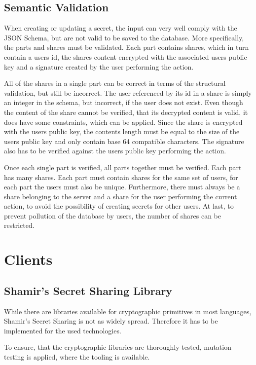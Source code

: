 \subsection{Semantic Validation}

When creating or updating a secret, the input can very well comply with the
JSON Schema, but are not valid to be saved to the database. More specifically,
the parts and shares must be validated. Each part contains shares, which in
turn contain a users id, the shares content encrypted with the associated users
public key and a signature created by the user performing the action.

All of the shares in a single part can be correct in terms of the structural
validation, but still be incorrect. The user referenced by its id in a share is
simply an integer in the schema, but incorrect, if the user does not exist.
Even though the content of the share cannot be verified, that its decrypted
content is valid, it does have some constraints, which can be applied. Since
the share is encrypted with the users public key, the contents length must be
equal to the size of the users public key and only contain base 64 compatible
characters. The signature also has to be verified against the users public key
performing the action.

Once each single part is verified, all parts together must be verified. Each
part has many shares. Each part must contain shares for the same set of users,
for each part the users must also be unique. Furthermore, there must always be
a share belonging to the server and a share for the user performing the current
action, to avoid the possibility of creating secrets for other users. At last,
to prevent pollution of the database by users, the number of shares can be
restricted.

\section{Clients}

\subsection{Shamir's Secret Sharing Library}

While there are libraries available for cryptographic primitives in most
languages, Shamir's Secret Sharing is not as widely spread. Therefore it has
to be implemented for the used technologies.

To ensure, that the cryptographic libraries are thoroughly tested, mutation
testing is applied, where the tooling is available.

